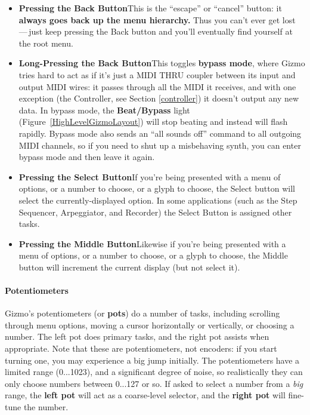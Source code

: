 \documentclass{article}
\begin{document}
\begin{itemize}
\item {\bf Pressing the Back Button}\quad This is the ``escape'' or ``cancel'' button: it {\bf always goes back up the menu hierarchy.}  Thus you can't ever get lost\,---\,just keep pressing the Back button and you'll eventually find yourself at the root menu.

\item {\bf Long-Pressing the Back Button}\quad This toggles {\bf bypass mode}, where Gizmo tries hard to act as if it's just a MIDI THRU coupler between its input and output MIDI wires: it passes through all the MIDI it receives, and with one exception (the Controller, see Section \ref{controller}) it doesn't output any new data.  In bypass mode, the {\bf Beat/Bypass} light (Figure~\ref{HighLevelGizmoLayout}) will stop beating and instead will flash rapidly.  Bypass mode also sends an ``all sounds off'' command to all outgoing MIDI channels, so if you need to shut up a misbehaving synth, you can enter bypass mode and then leave it again.

\item {\bf Pressing the Select Button}\quad If you're being presented with a menu of options, or a number to choose, or a glyph to choose, the Select button will select the currently-displayed option.  In some applications (such as the Step Sequencer, Arpeggiator, and Recorder) the Select Button is assigned other tasks.

\item {\bf Pressing the Middle Button}\quad Likewise if you're being presented with a menu of options, or a number to choose, or a glyph to choose, the Middle button will increment the current display (but not select it). 
\end{itemize}

\paragraph{Potentiometers}

Gizmo's potentiometers (or {\bf pots}) do a number of tasks, including scrolling through menu options, moving a cursor horizontally or vertically, or choosing a number.  The left pot does primary tasks, and the right pot assists when appropriate.  Note that these are potentiometers, not encoders: if you start turning one, you may experience a big jump initially.  The potentiometers have a limited range (0...1023), and a significant degree of noise, so realistically they can only choose numbers between 0...127 or so.  If asked to select a number from a {\it big} range, the {\bf left pot} will act as a coarse-level selector, and the {\bf right pot} will fine-tune the number.
\end{document}
